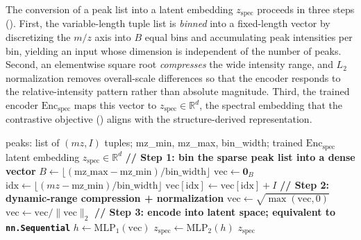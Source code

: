 The conversion of a peak list into a latent embedding $z_{\mathrm{spec}}$ proceeds in three steps (). 
First, the variable-length tuple list is \emph{binned} into a fixed-length vector by discretizing the $m/z$ axis into $B$ equal bins and accumulating peak intensities per bin, yielding an input whose dimension is independent of the number of peaks. 
Second, an elementwise square root \emph{compresses} the wide intensity range, and $L_2$ normalization removes overall-scale differences so that the encoder responds to the relative-intensity pattern rather than absolute magnitude. 
Third, the trained encoder $\mathrm{Enc}_{\mathrm{spec}}$ maps this vector to $z_{\mathrm{spec}} \in \mathbb{R}^{d}$, the spectral embedding that the contrastive objective () aligns with the structure-derived representation.


\begin{algorithm}
    \caption{Spectrum to latent embedding: from (m/z, intensity) tuples to $z_{\mathrm{spec}}$}
    \label{alg:spectrum-to-latent}
    \begin{algorithmic}[1]
        \Require peaks: list of $(mz, I)$ tuples; mz\_min, mz\_max, bin\_width; trained $\mathrm{Enc}_{\mathrm{spec}}$
        \Ensure latent embedding $z_{\mathrm{spec}} \in \mathbb{R}^{d}$
        \Statex
        \State \textbf{// Step 1: bin the sparse peak list into a dense vector}
        \State $B \gets \lfloor (\text{mz\_max} - \text{mz\_min}) / \text{bin\_width} \rfloor$ 
        \State $\text{vec} \gets \mathbf{0}_{B}$
            \State $\text{idx} \gets \lfloor (mz - \text{mz\_min}) / \text{bin\_width} \rfloor$
                \State $\text{vec}[\text{idx}] \gets \text{vec}[\text{idx}] + I$ 
            \EndIf
        \EndFor
        \Statex
        \State \textbf{// Step 2: dynamic-range compression + normalization}
        \State $\text{vec} \gets \sqrt{\max(\text{vec}, 0)}$ 
            \State $\text{vec} \gets \text{vec} / \lVert \text{vec} \rVert_2$ 
        \EndIf
        \Statex
        \State \textbf{// Step 3: encode into latent space; equivalent to \texttt{nn.Sequential}}
        \State $h \gets \text{MLP}_1(\text{vec})$ 
        \State $z_{\mathrm{spec}} \gets \text{MLP}_2(h)$
        \State \Return $z_{\mathrm{spec}}$
    \end{algorithmic}
\end{algorithm}


